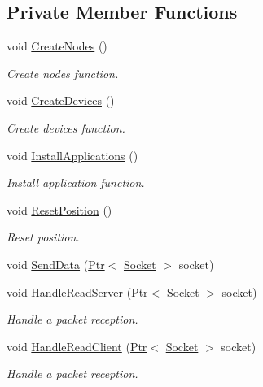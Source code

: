 \subsection*{Private Member Functions}
\begin{DoxyCompactItemize}
\item 
void \hyperlink{classHwmpSimplestRegressionTest_a7df5e53c90751f75dd2e5227732200c8}{Create\+Nodes} ()
\begin{DoxyCompactList}\small\item\em Create nodes function. \end{DoxyCompactList}\item 
void \hyperlink{classHwmpSimplestRegressionTest_a6866a6d6b0b93241ec0f0c29ef61fd39}{Create\+Devices} ()
\begin{DoxyCompactList}\small\item\em Create devices function. \end{DoxyCompactList}\item 
void \hyperlink{classHwmpSimplestRegressionTest_a8c6e0b9cf7ae88ff06694a2520978ffc}{Install\+Applications} ()
\begin{DoxyCompactList}\small\item\em Install application function. \end{DoxyCompactList}\item 
void \hyperlink{classHwmpSimplestRegressionTest_a50d0092d9d3f89eaa15670260a147de7}{Reset\+Position} ()
\begin{DoxyCompactList}\small\item\em Reset position. \end{DoxyCompactList}\item 
void \hyperlink{classHwmpSimplestRegressionTest_a8d054361a03110baf4d64e28695899f3}{Send\+Data} (\hyperlink{classns3_1_1Ptr}{Ptr}$<$ \hyperlink{classns3_1_1Socket}{Socket} $>$ socket)
\item 
void \hyperlink{classHwmpSimplestRegressionTest_a5e44f58f91f75ccc9ce42480febc9f5a}{Handle\+Read\+Server} (\hyperlink{classns3_1_1Ptr}{Ptr}$<$ \hyperlink{classns3_1_1Socket}{Socket} $>$ socket)
\begin{DoxyCompactList}\small\item\em Handle a packet reception. \end{DoxyCompactList}\item 
void \hyperlink{classHwmpSimplestRegressionTest_a1b498167f048f8f13f875371ed554a3e}{Handle\+Read\+Client} (\hyperlink{classns3_1_1Ptr}{Ptr}$<$ \hyperlink{classns3_1_1Socket}{Socket} $>$ socket)
\begin{DoxyCompactList}\small\item\em Handle a packet reception. \end{DoxyCompactList}\end{DoxyCompactItemize}
